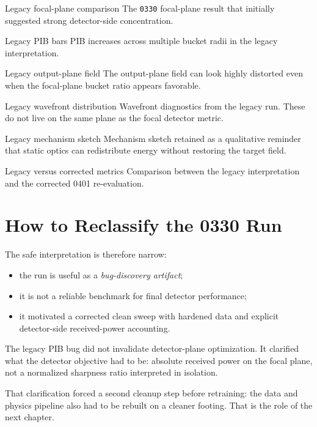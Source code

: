   {Legacy focal-plane comparison}
  {The \texttt{0330} focal-plane result that initially suggested strong detector-side
  concentration.}

  {Legacy PIB bars}
  {PIB increases across multiple bucket radii in the legacy interpretation.}

  {Legacy output-plane field}
  {The output-plane field can look highly distorted even when the focal-plane
  bucket ratio appears favorable.}

  {Legacy wavefront distribution}
  {Wavefront diagnostics from the legacy run. These do not live on the same
  plane as the focal detector metric.}

  {Legacy mechanism sketch}
  {Mechanism sketch retained as a qualitative reminder that static optics can
  redistribute energy without restoring the target field.}

  {Legacy versus corrected metrics}
  {Comparison between the legacy interpretation and the corrected 0401
  re-evaluation.}

\section{How to Reclassify the 0330 Run}

The safe interpretation is therefore narrow:
\begin{itemize}
  \item the run is useful as a \emph{bug-discovery artifact};
  \item it is not a reliable benchmark for final detector performance;
  \item it motivated a corrected clean sweep with hardened data and explicit
  detector-side received-power accounting.
\end{itemize}

\begin{breakthrough}
The legacy PIB bug did not invalidate detector-plane optimization. It clarified
what the detector objective had to be: absolute received power on the focal
plane, not a normalized sharpness ratio interpreted in isolation.
\end{breakthrough}

That clarification forced a second cleanup step before retraining: the data and
physics pipeline also had to be rebuilt on a cleaner footing. That is the role
of the next chapter.
